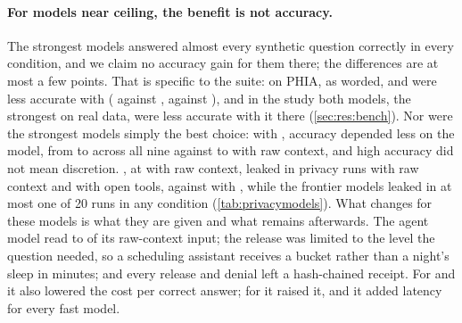 \paragraph{For models near ceiling, the benefit is not accuracy.} The strongest models answered almost every
synthetic question correctly in every condition, and we claim no accuracy gain for them there; the differences are at
most a few points. That is specific to the suite: on PHIA, as worded,  and 
were less accurate with \sys{} (\phiaWordedAstraC{} against \phiaWordedAstraA{}, \phiaWordedFableC{} against
\phiaWordedFableA{}), and in the study both  models, the strongest on real data, were less accurate
with it there (\cref{sec:res:bench}). Nor were the strongest models simply the best choice: with \sys{}, accuracy
depended less on the model, from \accCMin{} to \accCMax{} across all nine against \accAMin{} to \accAMax{} with raw
context, and high accuracy did not mean discretion. , at \accOssLargeA{} with raw context, leaked
in \leakOssLargeA{} privacy runs with raw context and \leakOssLargeB{} with open tools, against \leakOssLargeC{} with
\sys{}, while the frontier models leaked in at most one of 20 runs in any condition (\cref{tab:privacymodels}). What \sys{} changes for these models is what they are given and what remains afterwards. The agent model
read \ctxRatioCAMin{} to \ctxRatioCAMax{} of its raw-context input; the release was limited to the level the question
needed, so a scheduling assistant receives a bucket rather than a night's sleep in minutes; and every release and
denial left a hash-chained receipt. For  and  it also lowered the cost per
correct answer; for  it raised it, and it added latency for every fast model.

